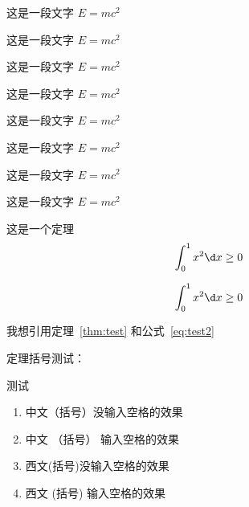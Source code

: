 \documentclass[type = doctor]{whu-thesis}
\begin{document}
\begin{corollary}
  这是一段文字 $E = m c^2$
\end{corollary}

\begin{lemma}
  这是一段文字 $E = m c^2$
\end{lemma}

\begin{axiom}
  这是一段文字 $E = m c^2$
\end{axiom}

\begin{counterexample}
  这是一段文字 $E = m c^2$
\end{counterexample}

\begin{conjecture}
  这是一段文字 $E = m c^2$
\end{conjecture}

\begin{question}
  这是一段文字 $E = m c^2$
\end{question}

\begin{claim}
  这是一段文字 $E = m c^2$
\end{claim}

\begin{remark}
  这是一段文字 $E = m c^2$
\end{remark}

\begin{theorem}[Cauchy]\label{thm:test}
  这是一个定理
  \begin{equation}\label{eq:test1}
    \int_{0}^{1} x^2 \d x \geq 0
  \end{equation}

  \begin{equation}\label{eq:test2}
    \int_{0}^{1} x^2 \d x \geq 0
  \end{equation}
\end{theorem}

我想引用定理~\ref{thm:test} 和公式~\ref{eq:test2}


定理括号测试：

\begin{theorem}
  测试
  \begin{enumerate}
    \item 中文（括号）没输入空格的效果
    \item 中文 （括号） 输入空格的效果
    \item 西文(括号)没输入空格的效果
    \item 西文 (括号) 输入空格的效果
  \end{enumerate}
\end{theorem} 
\end{document}
